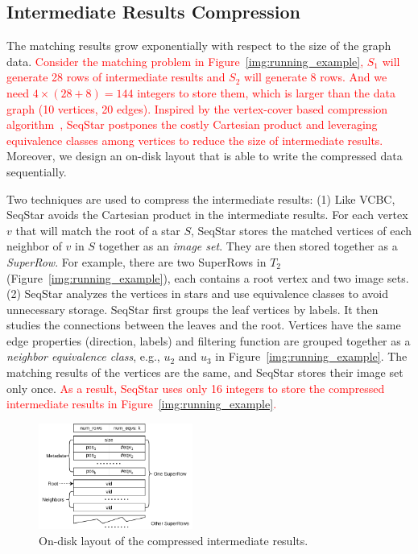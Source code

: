 \subsection{Intermediate Results Compression}\label{sec:match_compress}
The matching results grow exponentially with respect to the size of the graph data.
\textcolor{red}{Consider the matching problem in Figure~\ref{img:running_example},
$S_1$ will generate 28 rows of intermediate results and $S_2$ will generate 8 rows.
And we need $4 \times (28 + 8) = 144$ integers to store them, which is larger than the data graph (10 vertices, 20 edges).
Inspired by the vertex-cover based compression algorithm~\cite{DBLP:journals/pvldb/QiaoZC17},
SeqStar postpones the costly Cartesian product and leveraging equivalence classes among vertices to reduce the size of intermediate results.}
Moreover, we design an on-disk layout that is able to write the compressed data sequentially.

Two techniques are used to compress the intermediate results:
(1) Like VCBC, SeqStar avoids the Cartesian product in the intermediate results.
For each vertex $v$ that will match the root of a star $S$,
SeqStar stores the matched vertices of each neighbor of $v$ in $S$ together as an \emph{image set}.
They are then stored together as a \emph{SuperRow}.
For example, there are two SuperRows in $T_2$ (Figure~\ref{img:running_example}),
each contains a root vertex and two image sets.
(2) SeqStar analyzes the vertices in stars and use equivalence classes to avoid unnecessary storage.
SeqStar first groups the leaf vertices by labels.
It then studies the connections between the leaves and the root.
Vertices have the same edge properties (direction, labels) and filtering function are grouped together as a \emph{neighbor equivalence class},
e.g., $u_2$ and $u_3$ in Figure~\ref{img:running_example}.
The matching results of the vertices are the same, and SeqStar stores their image set only once.
\textcolor{red}{As a result, SeqStar uses only 16 integers to store the compressed intermediate results in Figure~\ref{img:running_example}.}
\begin{figure}[ht]
  \centering
  \includegraphics[width=0.45\textwidth]{img/compress.pdf}
  \caption{On-disk layout of the compressed intermediate results.}\label{img:compress}
\end{figure}

